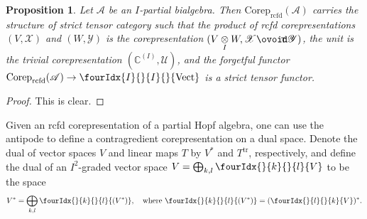 \documentclass[11pt]{article}
\DeclareMathOperator{\rcf}{\mathrm{rcfd}}
\DeclareMathOperator{\tr}{\mathrm{tr}}
\newcommand{\dual}[1]{#1^{*}}
\newcommand{\dualop}[1]{#1^{\tr}}
\newcommand{\Corep}{\mathrm{Corep}}
\newcommand{\Circt}{{\mathop{\ooalign{$\ovoid$\cr\hidewidth\raise-.05ex\hbox{$\scriptstyle\mathsf T\mkern3.5mu$}\cr}}}} %
\newcommand{\C}{\mathbb{C}}
\newcommand{\Vecti}{\Grd{\mathrm{Vect}}{I}{I}}
\newcommand{\itimes}{\underset{I}{\otimes}}
\newcommand{\Gr}[5]{\fourIdx{#2}{#4}{#3}{#5}{#1}}%
\newcommand{\Gru}[3]{\Gr{#1}{}{}{#2}{#3}}
\newcommand{\Grd}[3]{\Gr{#1}{#2}{#3}{}{}}
\newtheorem{Prop}[Theorem]{Proposition}
\theoremstyle{definition}
\numberwithin{equation}{section}
\begin{document}
\begin{Prop} \label{prop:rep-tensor} Let $\mathscr{A}$ be an
  $I$-partial bialgebra. Then  $\Corep_{\rcf}(\mathscr{A})$ carries the
  structure of strict tensor category such that the product of rcfd corepresentations $(V,\mathscr{X})$ and
  $(W,\mathscr{Y})$ is the corepresentation $(V\itimes
  W,\mathscr{X}\Circt \mathscr{Y})$, the unit is the trivial
  corepresentation $(\C^{(I)},\mathscr{U})$, and the forgetful functor
  $\Corep_{\rcf}(\mathscr{A}) \to \Vecti$ is a strict tensor functor.
\end{Prop}
\begin{proof}
This is clear.
\end{proof}

Given an rcfd corepresentation of a partial Hopf algebra, one can use the
antipode to define a contragredient corepresentation on a dual space.
Denote the dual of vector spaces $V$ and  linear maps $T$ by
$\dual{V}$ and $\dualop{T}$, respectively, and define the dual of an
$I^{2}$-graded vector space $V=\bigoplus_{k,l} \Gru{V}{k}{l}$ to be
the space
\begin{align*}
  \dual{V}=\bigoplus_{k,l} \Gru{(\dual{V})}{k}{l}, \quad \text{where }
\Gru{(\dual{V})}{k}{l} = \dual{(\Gru{V}{l}{k})}.
\end{align*}
\end{document}
